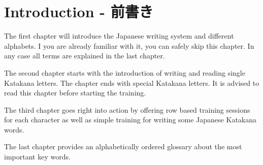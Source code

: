 \chapter*{Introduction - 前書き}

The first chapter will introduce the Japanese writing system and different
alphabets. I you are already familiar with it, you can safely skip this
chapter. In any case all terms are explained in the last chapter.

The second chapter starts with the introduction of writing and reading single
Katakana letters. The chapter ends with special Katakana letters. It is advised
to read this chapter before starting the training. 

The third chapter goes right into action by offering row based training
sessions for each character as well as simple training for writing some
Japanese Katakana words.


The last chapter provides an alphabetically ordered glossary about the most
important key words.

